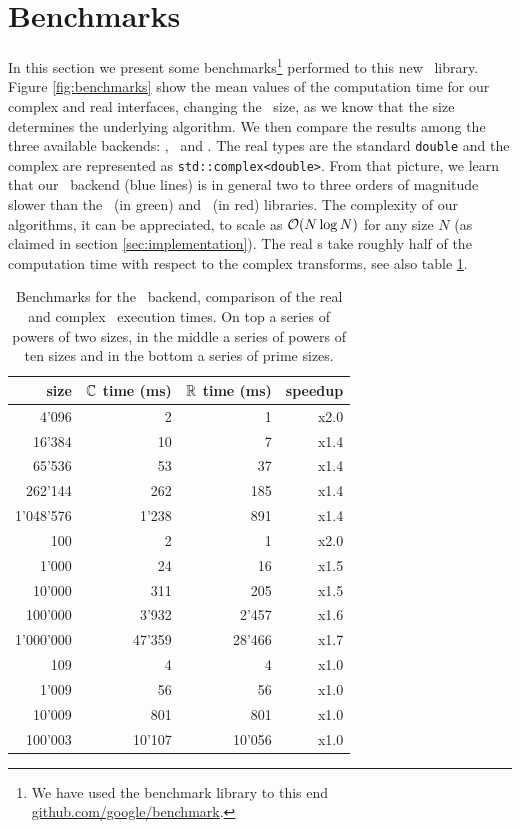 \section{Benchmarks}
In this section we present some benchmarks\footnote{We have used the benchmark
library to this end \url{github.com/google/benchmark}.} 
performed to this new \boostfft\
library. Figure \ref{fig:benchmarks} show the mean values of the computation
time for our complex and real interfaces,
changing the \dft\ size, as we know that the size determines the underlying algorithm.
We then compare the results among the three available backends: \bsl, \gsl\ and \fftw.
The real types are the standard \verb|double| and the complex are represented as 
\verb|std::complex<double>|.
From that picture, we learn that our \bsl\ backend (blue lines) is in general two to three
orders of magnitude slower than the \gsl\ (in green) and \fftw\ (in red) libraries. 
The complexity of our algorithms, it can be appreciated, to scale as 
$\mathcal{O}(N \log N)$ for any size $N$ (as claimed in section
\ref{sec:implementation}). The real \dft s take roughly half of the
computation time with respect to the complex transforms, see also table
\ref{tab:benchmarks}.
\begin{table}
    \centering
    \begin{tabular}{rrrr}
        \dft\ size & $\mathbb{C}$ time (ms) & $\mathbb{R}$ time (ms) & speedup \\
        \hline
4'096    &     2 &   1 & x2.0 \\
16'384   &    10 &   7 & x1.4 \\
65'536   &    53 &  37 & x1.4 \\
262'144  &   262 & 185 & x1.4 \\
1'048'576 &  1'238 & 891 & x1.4 \\
        \hline
100    & 2     & 1 & x2.0 \\
1'000   & 24    & 16 & x1.5 \\
10'000  & 311   & 205 & x1.5 \\
100'000 & 3'932  & 2'457 & x1.6 \\
1'000'000& 47'359 & 28'466 & x1.7 \\
        \hline
109     &    4  &    4  & x1.0\\
1'009   &    56  &   56 & x1.0 \\
10'009  &   801  &  801 & x1.0 \\
100'003 &  10'107 &10'056  & x1.0 \\
    \end{tabular}
    \caption{Benchmarks for the \bsl\ backend, comparison of the real and
    complex \dft\ execution times. On top a series of powers of two sizes, in
    the middle a series of powers of ten sizes and in the bottom a series of
    prime sizes.}
    \label{tab:benchmarks}
\end{table}
